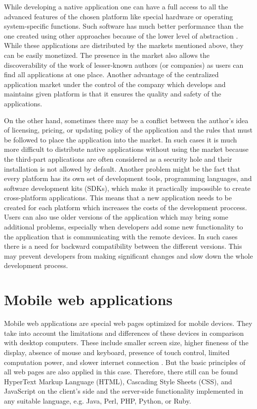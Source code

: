 \documentclass[12pt,oneside,final]{fithesis2}
\begin{document}
While developing a native application one can have a full access to all the advanced features of the chosen platform like special hardware or operating system-specific functions.
Such software has much better performance than the one created using other approaches because of the lower level of abstraction \cite{cowart13}.
While these applications are distributed by the markets mentioned above, they can be easily monetized.
The presence in the market also allows the discoverability of the work of lesser-known authors (or companies) as users can find all applications at one place.
Another advantage of the centralized application market under the control of the company which develops and maintains given platform is that it ensures the quality and safety of the applications.

On the other hand, sometimes there may be a conflict between the author's idea of licensing, pricing, or updating policy of the application and the rules that must be followed to place the application into the market.
In such cases it is much more difficult to distribute native applications without using the market because the third-part applications are often considered as a security hole and their installation is not allowed by default.
Another problem might be the fact that every platform has its own set of development tools, programming languages, and software development kits (SDKs), which make it practically impossible to create cross-platform applications.
This means that a new application needs to be created for each platform which increases the costs of the development proccess.
Users can also use older versions of the application which may bring some additional problems, especially when developers add some new functionality to the application that is communicating with the remote devices.
In such cases there is a need for backward compatibility between the different versions.
This may prevent developers from making significant changes and slow down the whole development process.

\section{Mobile web applications}
Mobile web applications are special web pages optimized for mobile devices.
They take into account the limitations and differences of these devices in comparison with desktop computers.
These include smaller screen size, higher fineness of the display, absence of mouse and keyboard, presence of touch control, limited computation power, and slower internet connection \cite{wroblewski11}.
But the basic principles of all web pages are also applied in this case.
Therefore, there still can be found HyperText Markup Language (HTML), Cascading Style Sheets (CSS), and JavaScript on the client's side and the server-side functionality implemented in any suitable language, e.g. Java, Perl, PHP, Python, or Ruby.
\end{document}

